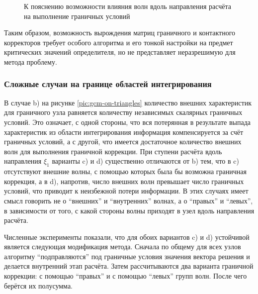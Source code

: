 \begin{figure}[H]
	\caption{К пояснению возможности влияния волн вдоль направления расчёта на выполнение граничных условий}
	\label{pic:fixed-normal-velocity}
\end{figure}

Таким образом, возможность вырождения матриц граничного и контактного корректоров 
требует особого алгоритма и его тонкой настройки на предмет критических значений определителя, 
но не представляет неразрешимую для метода проблему.


\subsubsection{Сложные случаи на границе областей интегрирования}
\label{bad_border_cases}
В случае b) на рисунке \ref{pic:gcm-on-triangles} 
количество внешних характеристик для граничного узла равняется количеству независимых 
скалярных граничных условий. Это означает, с одной стороны, 
что вся потерянная в результате выпада характеристик из области интегрирования информация 
компенсируется за счёт граничных условий, а с другой, 
что имеется достаточное количество внешних волн для выполнения граничной коррекции. 
При ступени расчёта вдоль направления $\xi_1$ варианты c) и d) 
существенно отличаются от b) тем, что  
в c) отсутствуют внешние волны, с помощью которых была бы возможна граничная коррекция, 
а в d), напротив, число внешних волн превышает число граничных условий, что 
приводит к неизбежной потери информации. В этих случаях имеет смысл говорить не о 
``внешних'' и ``внутренних'' волнах, а о ``правых'' и ``левых'', в зависимости от 
того, с какой стороны волны приходят в узел вдоль направления расчёта.

Численные эксперименты показали, что для обоих вариантов c) и d) устойчивой является 
следующая модификация метода. 
Сначала по общему для всех узлов алгоритму ``подправляются'' под 
граничные условия значения вектора решения и делается внутренний этап расчёта. 
Затем рассчитываются два варианта граничной коррекции: с помощью ``правых'' и 
с помощью ``левых'' групп волн. После чего берётся их полусумма. 

